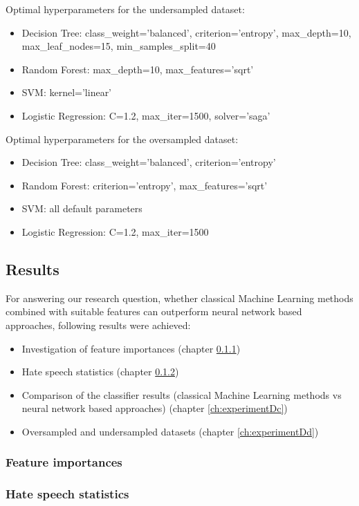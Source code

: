 Optimal hyperparameters for the undersampled dataset:
\begin{itemize}
	\item Decision Tree: class\_weight='balanced', criterion='entropy', max\_depth=10, max\_leaf\_nodes=15, min\_samples\_split=40
	\item Random Forest: max\_depth=10, max\_features='sqrt'
	\item SVM: kernel='linear'
	\item Logistic Regression: C=1.2, max\_iter=1500, solver='saga'
\end{itemize}

Optimal hyperparameters for the oversampled dataset:
\begin{itemize}
	\item Decision Tree: class\_weight='balanced', criterion='entropy'
	\item Random Forest: criterion='entropy', max\_features='sqrt'
	\item SVM: all default parameters
	\item Logistic Regression: C=1.2, max\_iter=1500
\end{itemize}


\subsection{Results}

For answering our research question, whether classical Machine Learning methods combined with suitable features can outperform neural network based approaches, following results were achieved:
\begin{itemize}
	\item Investigation of feature importances (chapter \ref{ch:experimentDa})
	\item Hate speech statistics (chapter \ref{ch:experimentDb})
	\item Comparison of the classifier results (classical Machine Learning methods vs neural network based approaches) (chapter \ref{ch:experimentDc})
	\item Oversampled and undersampled datasets (chapter \ref{ch:experimentDd})
\end{itemize}

\subsubsection{Feature importances}
\label{ch:experimentDa}


\subsubsection{Hate speech statistics}
\label{ch:experimentDb}

